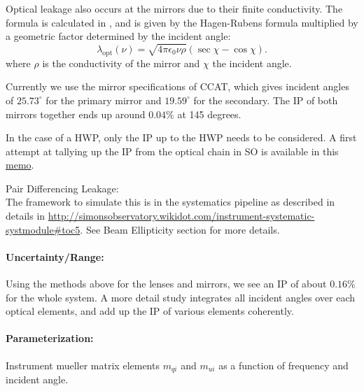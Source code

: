 Optical leakage also occurs at the mirrors due to their finite conductivity. 
The formula is calculated in \cite{Barkats:2005sh}, and is given by the Hagen-Rubens formula multiplied by 
a geometric factor determined by the incident angle:
\begin{equation}
\lambda_\text{opt}(\nu) = \sqrt{4 \pi \epsilon_0 \nu \rho} (\sec \chi - \cos \chi).
\end{equation}
where $\rho$ is the conductivity of the mirror and $\chi$ the incident angle.

Currently we use the mirror specifications of CCAT, which gives incident angles of $25.73^\circ$ for the primary mirror 
and $19.59^\circ$ for the secondary. The IP of both mirrors together ends up around $0.04\%$ at 145 degrees.

In the case of a HWP, only the IP up to the HWP needs to be considered.
A first attempt at tallying up the IP from the optical chain in SO is available in this \href{http://simonsobservatory.wdfiles.com/local--files/calandsys-telecon/eb_leakage_from_pointing_error.pdf?ukey=61f26ef33e8439a4e7096ab52c54c523066a4e35}{memo}.


\noindent Pair Differencing Leakage: \\
The framework to simulate this is in the systematics pipeline as described in details in \url{http://simonsobservatory.wikidot.com/instrument-systematic-systmodule#toc5}.
See Beam Ellipticity section for more details.

\paragraph{Uncertainty/Range:}
Using the methods above for the lenses and mirrors, we see an IP of about $0.16\%$ for the whole system.
A more detail study integrates all incident angles over each optical elements, and add up the IP of various elements  coherently.

\paragraph{Parameterization:}
Instrument mueller matrix elements $m_{qi}$ and $m_{ui}$ as a function of frequency and incident angle.


